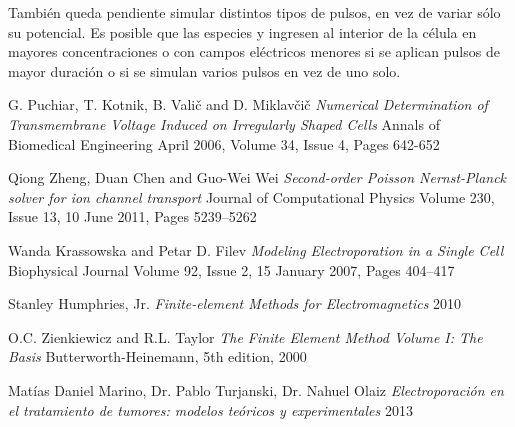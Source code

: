 \documentclass[11pt,a4paper,twoside]{tesis}
\newcommand{\na}{\ce{Na^+}}
\newcommand{\cl}{\ce{Cl^-}}
\begin{document}
También queda pendiente simular distintos tipos de pulsos, en vez de variar sólo su potencial. Es posible que las especies \na y \cl ingresen al interior de la célula en mayores concentraciones o con campos eléctricos menores si se aplican pulsos de mayor duración o si se simulan varios pulsos en vez de uno solo. \\

\begin{thebibliography}{9}

	G. Puchiar, T. Kotnik, B. Valič and D. Miklavčič
	\emph{Numerical Determination of Transmembrane Voltage Induced on Irregularly Shaped Cells}
	Annals of Biomedical Engineering
	April 2006, Volume 34, Issue 4, Pages 642-652

	Qiong Zheng, Duan Chen and Guo-Wei Wei
	\emph{Second-order Poisson Nernst-Planck solver for ion channel transport}
	Journal of Computational Physics
	Volume 230, Issue 13, 10 June 2011, Pages 5239–5262

	Wanda Krassowska and Petar D. Filev
	\emph{Modeling Electroporation in a Single Cell}
	Biophysical Journal
	Volume 92, Issue 2, 15 January 2007, Pages 404–417

	Stanley Humphries, Jr.
	\emph{Finite-element Methods for Electromagnetics}
	2010

	O.C. Zienkiewicz and R.L. Taylor
	\emph{The Finite Element Method Volume I: The Basis}
	Butterworth-Heinemann,
	5th edition,
	2000

	Matías Daniel Marino, Dr. Pablo Turjanski, Dr. Nahuel Olaiz
	\emph{Electroporación en el tratamiento de tumores: modelos teóricos y experimentales}
	2013

\end{thebibliography}
\end{document}
